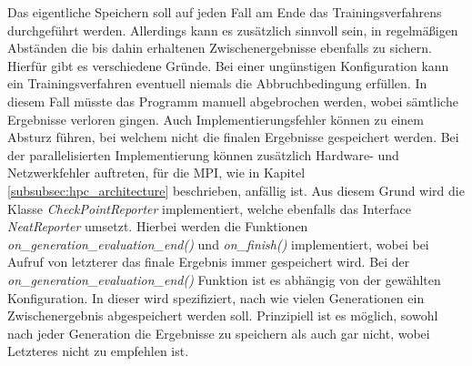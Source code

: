 Das eigentliche Speichern soll auf jeden Fall am Ende das Trainingsverfahrens durchgeführt werden. Allerdings kann es zusätzlich sinnvoll sein, in regelmäßigen Abständen die bis dahin erhaltenen Zwischenergebnisse ebenfalls zu sichern. Hierfür gibt es verschiedene Gründe. Bei einer ungünstigen Konfiguration kann ein Trainingsverfahren eventuell niemals die Abbruchbedingung erfüllen. In diesem Fall müsste das Programm manuell abgebrochen werden, wobei sämtliche Ergebnisse verloren gingen. Auch Implementierungsfehler können zu einem Absturz führen, bei welchem nicht die finalen Ergebnisse gespeichert werden. Bei der parallelisierten Implementierung können zusätzlich Hardware- und Netzwerkfehler auftreten, für die \ac{MPI}, wie in Kapitel \ref{subsubsec:hpc_architecture} beschrieben, anfällig ist. Aus diesem Grund wird die Klasse \emph{CheckPointReporter} implementiert, welche ebenfalls das Interface \emph{NeatReporter} umsetzt. Hierbei werden die Funktionen \emph{on\_generation\_evaluation\_end()} und \emph{on\_finish()} implementiert, wobei bei Aufruf von letzterer das finale Ergebnis immer gespeichert wird. Bei der \emph{on\_generation\_evaluation\_end()} Funktion ist es abhängig von der gewählten Konfiguration. In dieser wird spezifiziert, nach wie vielen Generationen ein Zwischenergebnis abgespeichert werden soll. Prinzipiell ist es möglich, sowohl nach jeder Generation die Ergebnisse zu speichern als auch gar nicht, wobei Letzteres nicht zu empfehlen ist.

